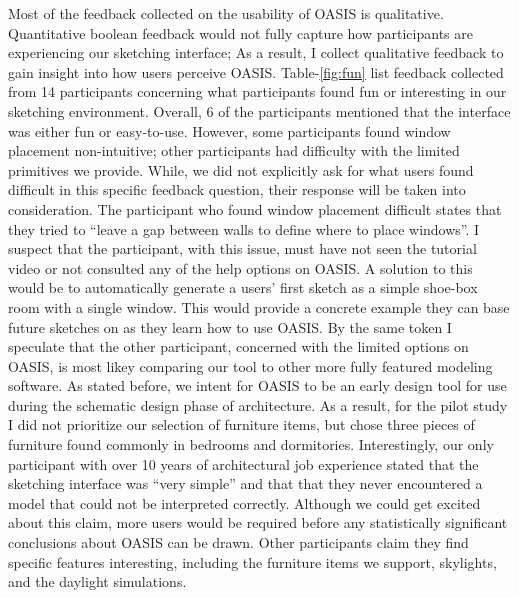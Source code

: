 Most of the feedback collected on the usability of OASIS is qualitative.  Quantitative boolean feedback would not fully capture how participants are experiencing our sketching interface; As a result, I collect qualitative feedback to gain insight into how users perceive OASIS.  Table-\ref{fig:fun} list feedback collected from 14 participants concerning what participants found fun or interesting in our sketching environment.  Overall, 6 of the participants mentioned that the interface was either fun or easy-to-use.  However, some participants found window placement non-intuitive; other participants had difficulty with the limited primitives we provide.  While, we did not explicitly ask for what users found difficult in this specific feedback question, their response will be taken into consideration.  The participant who found window placement difficult states that they tried to ``leave a gap between walls to define where to place windows''.  I suspect that the participant, with this issue, must have not seen the tutorial video or not consulted any of the help options on OASIS.  A solution to this would be to automatically generate a users' first sketch as a simple shoe-box room with a single window. This would provide a concrete example they can base future sketches on as they learn how to use OASIS.  By the same token I speculate that the other participant, concerned with the limited options on OASIS, is most likey comparing our tool to other more fully featured modeling software.  As stated before, we intent for OASIS to be an early design tool for use during the schematic design phase of architecture.  As a result, for the pilot study I did not prioritize our selection of furniture items, but chose three pieces of furniture found commonly in bedrooms and dormitories.  Interestingly, our only participant with over 10 years of architectural job experience stated that the sketching interface was ``very simple'' and that that they never encountered a model that could not be interpreted correctly. Although we could get excited about this claim, more users would be required before any statistically significant conclusions about OASIS can be drawn.  Other participants claim they find specific features interesting, including the furniture items we support, skylights, and the daylight simulations.  \\

